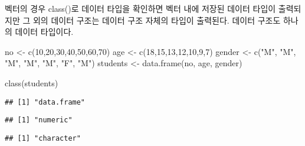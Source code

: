 \documentclass[
]{article}
\newenvironment{Shaded}{\begin{snugshade}}{\end{snugshade}}
\newcommand{\CommentTok}[1]{\textcolor[rgb]{0.56,0.35,0.01}{\textit{#1}}}
\newcommand{\DecValTok}[1]{\textcolor[rgb]{0.00,0.00,0.81}{#1}}
\newcommand{\FunctionTok}[1]{\textcolor[rgb]{0.00,0.00,0.00}{#1}}
\newcommand{\NormalTok}[1]{#1}
\newcommand{\OtherTok}[1]{\textcolor[rgb]{0.56,0.35,0.01}{#1}}
\newcommand{\SpecialCharTok}[1]{\textcolor[rgb]{0.00,0.00,0.00}{#1}}
\newcommand{\StringTok}[1]{\textcolor[rgb]{0.31,0.60,0.02}{#1}}
\begin{document}
벡터의 경우 class()로 데이터 타입을 확인하면 벡터 내에 저장된 데이터
타입이 출력되지만 그 외의 데이터 구조는 데이터 구조 자체의 타입이
출력된다. 데이터 구조도 하나의 데이터 타입이다.

\begin{Shaded}
\begin{Highlighting}[]
\NormalTok{no }\OtherTok{\textless{}{-}} \FunctionTok{c}\NormalTok{(}\DecValTok{10}\NormalTok{,}\DecValTok{20}\NormalTok{,}\DecValTok{30}\NormalTok{,}\DecValTok{40}\NormalTok{,}\DecValTok{50}\NormalTok{,}\DecValTok{60}\NormalTok{,}\DecValTok{70}\NormalTok{)}
\NormalTok{age }\OtherTok{\textless{}{-}} \FunctionTok{c}\NormalTok{(}\DecValTok{18}\NormalTok{,}\DecValTok{15}\NormalTok{,}\DecValTok{13}\NormalTok{,}\DecValTok{12}\NormalTok{,}\DecValTok{10}\NormalTok{,}\DecValTok{9}\NormalTok{,}\DecValTok{7}\NormalTok{)}
\NormalTok{gender }\OtherTok{\textless{}{-}} \FunctionTok{c}\NormalTok{(}\StringTok{"M"}\NormalTok{, }\StringTok{"M"}\NormalTok{, }\StringTok{"M"}\NormalTok{, }\StringTok{"M"}\NormalTok{, }\StringTok{"M"}\NormalTok{, }\StringTok{"F"}\NormalTok{, }\StringTok{"M"}\NormalTok{)}
\NormalTok{students }\OtherTok{\textless{}{-}} \FunctionTok{data.frame}\NormalTok{(no, age, gender)}

\FunctionTok{class}\NormalTok{(students)}
\end{Highlighting}
\end{Shaded}

\begin{verbatim}
## [1] "data.frame"
\end{verbatim}

\begin{Shaded}
\end{Shaded}

\begin{verbatim}
## [1] "numeric"
\end{verbatim}

\begin{Shaded}
\end{Shaded}

\begin{verbatim}
## [1] "character"
\end{verbatim}
\end{document}
